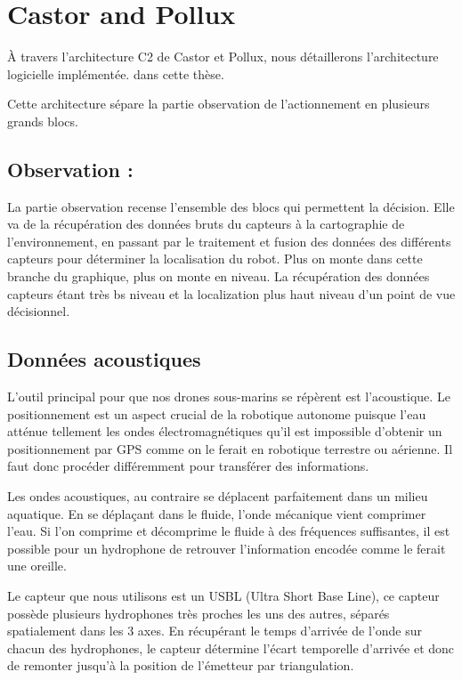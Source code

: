 \documentclass[twocolumn]{article}
\begin{document}
\section{Castor and Pollux}

À travers l'architecture C2 de Castor et Pollux, nous détaillerons l'architecture logicielle implémentée. dans cette thèse. 

Cette architecture sépare la partie observation de l'actionnement en plusieurs grands blocs. 

\subsection{Observation :}

La partie observation recense l'ensemble des blocs qui permettent la décision. Elle va de la récupération des données bruts du capteurs à la cartographie de l'environnement, en passant par le traitement et fusion des données des différents capteurs pour déterminer la localisation du robot. 
Plus on monte dans cette branche du graphique, plus on monte en niveau. La récupération des données capteurs étant très bs niveau et la localization plus haut niveau d'un point de vue décisionnel. 

\subsection{Données acoustiques}


L'outil principal pour que nos drones sous-marins se répèrent est l'acoustique. Le positionnement est un aspect crucial de la robotique autonome puisque l'eau atténue tellement les ondes électromagnétiques qu'il est impossible d'obtenir un positionnement par GPS comme on le ferait en robotique terrestre ou aérienne. Il faut donc procéder différemment pour transférer des informations. 

Les ondes acoustiques, au contraire se déplacent parfaitement dans un milieu aquatique. En se déplaçant dans le fluide, l'onde mécanique vient comprimer l'eau. Si l'on comprime et décomprime le fluide à des fréquences suffisantes, il est possible pour un hydrophone de retrouver l'information encodée comme le ferait une oreille. 

Le capteur que nous utilisons est un USBL (Ultra Short Base Line), ce capteur possède plusieurs hydrophones très proches les uns des autres, séparés spatialement dans les 3 axes. En récupérant le temps d'arrivée de l'onde sur chacun des hydrophones, le capteur détermine l'écart temporelle d'arrivée et donc de remonter jusqu'à la position de l'émetteur par triangulation. 
\end{document}

